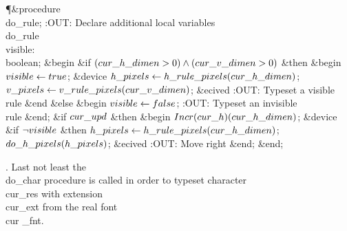 \Y\P\4\&{procedure}\1\  \\{do\_rule};\6
:OUT: Declare additional local variables \\{do\_rule}\X\6
\4\\{visible}: \\{boolean};\2\6
\&{begin} \&{if} $(\\{cur\_h\_dimen}>0)\land(\\{cur\_v\_dimen}>0)$ \1\&{then}\6
\&{begin} $\\{visible}\gets\\{true}$;\6
\&{device} $\\{h\_pixels}\gets\\{h\_rule\_pixels}(\\{cur\_h\_dimen})$;\5
$\\{v\_pixels}\gets\\{v\_rule\_pixels}(\\{cur\_v\_dimen})$;\6
\&{ecived}\6
:OUT: Typeset a visible \\{rule}\X\6
\&{end}\6
\4\&{else} \&{begin} $\\{visible}\gets\\{false}$;\5
:OUT: Typeset an invisible \\{rule}\X\6
\&{end};\2\6
\&{if} $\\{cur\_upd}$ \1\&{then}\6
\&{begin} $\\{Incr}(\\{cur\_h})(\\{cur\_h\_dimen})$;\6
\&{device} \&{if} $\lnot\\{visible}$ \1\&{then}\5
$\\{h\_pixels}\gets\\{h\_rule\_pixels}(\\{cur\_h\_dimen})$;\2\6
$\\{do\_h\_pixels}(\\{h\_pixels})$;\6
\&{ecived}\6
:OUT: Move right\X\6
\&{end};\2\6
\&{end};\par
\fi

. Last not least the \\{do\_char} procedure is called in order to typeset
character~\\{cur\_res} with extension~\\{cur\_ext} from the real font~\\{cur%
\_fnt}.

